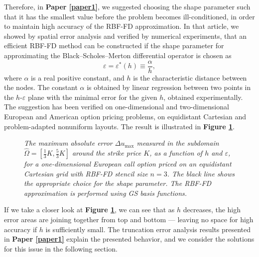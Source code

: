 \documentclass{UUThesisTemplate}
\begin{document}
\par
Therefore, in \textbf{Paper \ref{paper1}}, we suggested choosing the shape parameter such that it has the smallest value before the problem becomes ill-conditioned, in order to maintain high accuracy of the RBF-FD approximation. In that article, we showed by spatial error analysis and verified by numerical experiments, that an efficient RBF-FD method can be constructed if the shape parameter for approximating the Black--Scholes--Merton differential operator is chosen as 
\begin{equation}
\varepsilon=\varepsilon^*(h)\equiv\frac{\alpha}{h},
\label{eq:shape}
\end{equation}
where $\alpha$ is a real positive constant, and $h$ is the characteristic distance between the nodes. The constant $\alpha$ is obtained by linear regression between two points in the $h$-$\varepsilon$ plane with the minimal error for the given $h$, obtained experimentally. The suggestion has been verified on one-dimensional and two-dimensional European and American option pricing problems, on equidistant Cartesian and problem-adapted nonuniform layouts. The result is illustrated in \textbf{Figure \ref{fig:contour1}}.
\begin{figure}[H]
\centering
%

\caption{\emph{The maximum absolute error $\Delta u_{\max}$ measured in the subdomain $\hat\Omega=[\frac{1}{3}K,\frac{5}{3}K]$ around the strike price $K$, as a function of $h$ and $\varepsilon$, for a one-dimensional European call option priced on an equidistant Cartesian grid with RBF-FD stencil size $n=3$. The black line shows the appropriate choice for the shape parameter. The RBF-FD approximation is performed using GS basis functions.}}
\label{fig:contour1}
\end{figure}
If we take a closer look at \textbf{Figure \ref{fig:contour1}}, we can see that as $h$ decreases, the high error areas are joining together from top and bottom --- leaving no space for high accuracy if $h$ is sufficiently small. The truncation error analysis results presented in \textbf{Paper \ref{paper1}} explain the presented behavior, and we consider the solutions for this issue in the following section. 
%





%





%
\end{document}

